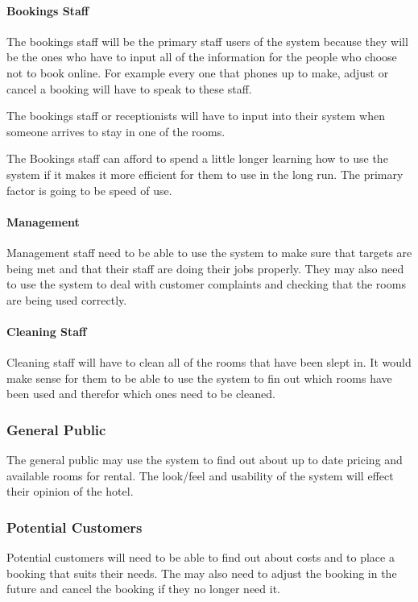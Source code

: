 \documentclass[12pt]{article}
\begin{document}
\paragraph{Bookings Staff}
The bookings staff will be the primary staff users of the system because
they will be the ones who have to input all of the information for the 
people who choose not to book online. For example every one that phones up
to make, adjust or cancel a booking will have to speak to these staff.

The bookings staff or receptionists will have to input into their system
when someone arrives to stay in one of the rooms.

The Bookings staff can afford to spend a little longer learning how to use
the system if it makes it more efficient for them to use in the long run.
The primary factor is going to be speed of use.

\paragraph{Management}
Management staff need to be able to use the system to make sure that targets
are being met and that their staff are doing their jobs properly. They may 
also need to use the system to deal with customer complaints and checking that
the rooms are being used correctly.

\paragraph{Cleaning Staff}
Cleaning staff will have to clean all of the rooms that have been slept in.
It would make sense for them to be able to use the system to fin out which
rooms have been used and therefor which ones need to be cleaned.

\subsubsection{General Public}
The general public may use the system to find out about up to date pricing
and available rooms for rental. The look/feel and usability of the system 
will effect their opinion of the hotel.

\subsubsection{Potential Customers}
Potential customers will need to be able to find out about costs and to place
a booking that suits their needs. The may also need to adjust the booking in 
the future and cancel the booking if they no longer need it.
\end{document}
